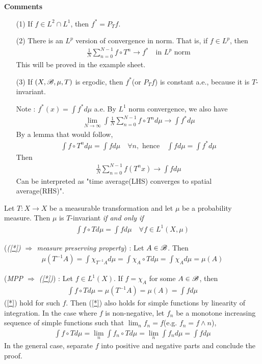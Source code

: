 \documentclass[12pt,a4paper]{report}
\newenvironment{proof}
{\begin{changemargin}{1cm}{0.5cm} 
	}%
	{\end{changemargin}
}
\begin{document}
\textbf{Comments}
\begin{itemize}
\item[(1)] If $f\in L^2 \cap L^1$, then $f^* = P_T f$.
\item[(2)] There is an $L^p$ version of convergence in norm. That is, if $f\in L^p$, then
\begin{align*}
\frac{1}{N} \sum_{n=0}^{N-1} f\circ T^n \rightarrow f^* \quad \text{in } L^p \text{ norm}
\end{align*}
This will be proved in the example sheet.
\item[(3)] If $(X,\mathscr{B}, \mu, T)$ is ergodic, then $f^*$(or $P_T f$) is constant a.e., because it is $T$-invariant.

\quad Note : $f^*(x)  = \int f^* d\mu$ a.e. By $L^1$ norm convergence, we also have
\begin{align*}
\lim_{N\rightarrow \infty} \int \frac{1}{N} \sum_{n=0}^{N-1} f\circ T^n d\mu \rightarrow \int f^* d\mu
\end{align*}
By a lemma that would follow,
\begin{align*}
\int f\circ T^n d\mu = \int fd\mu \quad \forall n, \text{ hence} \quad \int f d\mu = \int f^* d\mu
\end{align*}
Then
\begin{align*}
\frac{1}{N} \sum_{n=0}^{N-1}f(T^n x) \rightarrow \int f d\mu
\end{align*}
Can be interpreted as "time average(LHS) converges to spatial average(RHS)".
\end{itemize}
\s

\lem Let $T : X \rightarrow X$ be a measurable transformation and let $\mu$ be a probability measure. Then $\mu$ is $T$-invariant \emph{if and only if}
\begin{align}
\int f\circ T d \mu = \int f d\mu \quad \forall f \in L^1(X,\mu)  \label{*}
\end{align}
\begin{proof}
\pf  (\emph{(\ref{*}) $\Rightarrow$ measure preserving property}) : Let $A\in \mathscr{B}$. Then
\begin{align*}
\mu(T^{-1} A) = \int \chi_{T^{-1} A} d\mu = \int \chi_A \circ T d\mu = \int \chi_A d\mu = \mu(A)
\end{align*}

(\emph{MPP $\Rightarrow$ (\ref{*})}) : Let $f\in L^1(X)$. If $f= \chi_A$ for some $A\in \mathscr{B}$, then
\begin{align*}
\int f \circ T d\mu = \mu(T^{-1}A) = \mu (A)  = \int f d\mu
\end{align*}
(\ref{*}) hold for such $f$. Then (\ref{*}) also holds for simple functions by linearity of integration. In the case where $f$ is non-negative, let $f_n$ be a monotone increasing sequence of simple functions such that $\lim_n f_n = f$(e.g. $f_n = f\wedge n$),
\begin{align*}
\int f\circ T d\mu = \lim_n \int f_n \circ T d\mu = \lim_n \int f_n d\mu = \int fd\mu
\end{align*}
\quad In the general case, separate $f$ into positive and negative parts and conclude the proof.

\eop
\end{proof}
\s
\end{document}
